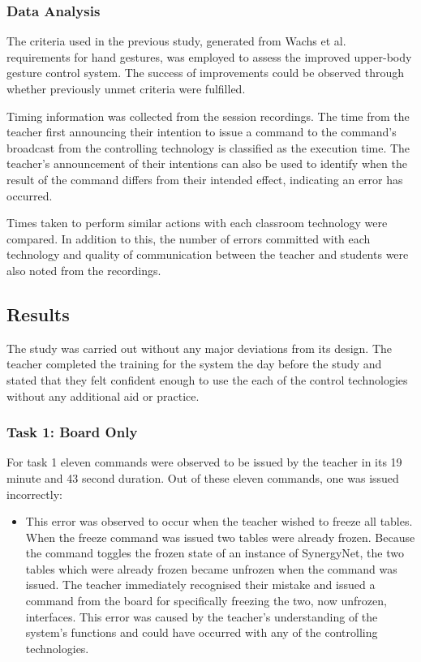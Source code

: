 \documentclass[link]{IWCOMP}
\begin{document}
\subsubsection{Data Analysis}
\label{subsec:studyPhase2Analysis}

The criteria used in the previous study, generated from Wachs et al.~\cite{Wachs2011} requirements for hand gestures, was employed to assess the improved upper-body gesture control system.
The success of improvements could be observed through whether previously unmet criteria were fulfilled.

Timing information was collected from the session recordings.
The time from the teacher first announcing their intention to issue a command to the command's broadcast from the controlling technology is classified as the execution time.
The teacher's announcement of their intentions can also be used to identify when the result of the command differs from their intended effect, indicating an error has occurred.

Times taken to perform similar actions with each classroom technology were compared.
In addition to this, the number of errors committed with each technology and quality of communication between the teacher and students were also noted from the recordings.

\subsection{Results}
\label{subsec:studyPhase2Results}


The study was carried out without any major deviations from its design.
The teacher completed the training for the system the day before the study and stated that they felt confident enough to use the each of the control technologies without any additional aid or practice.

\subsubsection{Task 1: Board Only}
\label{subsubsec:studyPhase2ResultsTask1}

For task 1 eleven commands were observed to be issued by the teacher in its 19 minute and 43 second duration.
Out of these eleven commands, one was issued incorrectly:

\begin{itemize}
\item This error was observed to occur when the teacher wished to freeze all tables.
When the freeze command was issued two tables were already frozen.
Because the command toggles the frozen state of an instance of SynergyNet, the two tables which were already frozen became unfrozen when the command was issued.
The teacher immediately recognised their mistake and issued a command from the board for specifically freezing the two, now unfrozen, interfaces.
This error was caused by the teacher's understanding of the system's functions and could have occurred with any of the controlling technologies.
\end{itemize}
\end{document}

